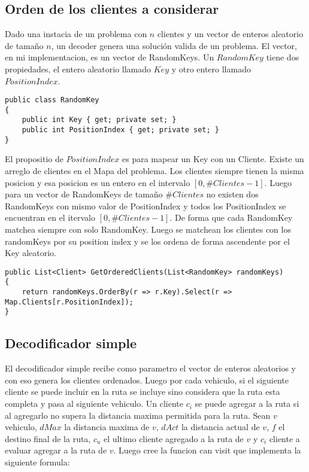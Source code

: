 \subsection{Orden de los clientes a considerar}\label{sec:ordenDeco}

Dado una instacia de un problema con $n$ clientes y un vector de enteros aleatorio de tamaño $n$, un decoder genera una solución valida de un problema. El vector, en mi implementacion, es un vector de RandomKeys. Un $RandomKey$ tiene dos propiedades, el entero aleatorio llamado $Key$ y otro entero llamado $PositionIndex$. 

\bigskip

\begin{lstlisting} 
public class RandomKey
{        
	public int Key { get; private set; }
	public int PositionIndex { get; private set; }
}
\end{lstlisting}

\bigskip

El propositio de $PositionIndex$ es para mapear un Key con un Cliente. Existe un arreglo de clientes en el Mapa del problema. Los clientes siempre tienen la misma posicion y esa posicion es un entero en el intervalo $[0, \#Clientes-1]$. Luego para un vector de RandomKeys de tamaño $\#Clientes$ no existen dos RandomKeys con mismo valor de PositionIndex y todos los PositionIndex se encuentran en el itervalo $[0, \#Clientes-1]$. De forma que cada RandomKey matchea siempre con solo RandomKey. Luego se matchean los clientes con los randomKeys por su position index y se los ordena de forma ascendente por el Key aleatorio.

\bigskip

\begin{lstlisting} 
public List<Client> GetOrderedClients(List<RandomKey> randomKeys)
{        
	return randomKeys.OrderBy(r => r.Key).Select(r => Map.Clients[r.PositionIndex]);
}
\end{lstlisting}

\subsection{Decodificador simple}

El decodificador simple recibe como parametro el vector de enteros aleatorios y con eso genera los clientes ordenados. Luego por cada vehiculo, si el siguiente cliente se puede incluir en la ruta se incluye sino considera que la ruta esta completa y pasa al siguiente vehiculo. Un cliente $c_i$ se puede agregar a la ruta si al agregarlo no supera la distancia maxima permitida para la ruta. Sean $v$ vehiculo, $dMax$ la distancia maxima de $v$, $dAct$ la distancia actual de $v$, $f$ el destino final de la ruta, $c_u$ el ultimo cliente agregado a la ruta de $v$ y $c_i$ cliente a evaluar agregar a la ruta de $v$. Luego cree la funcion can visit que implementa la siguiente formula:

